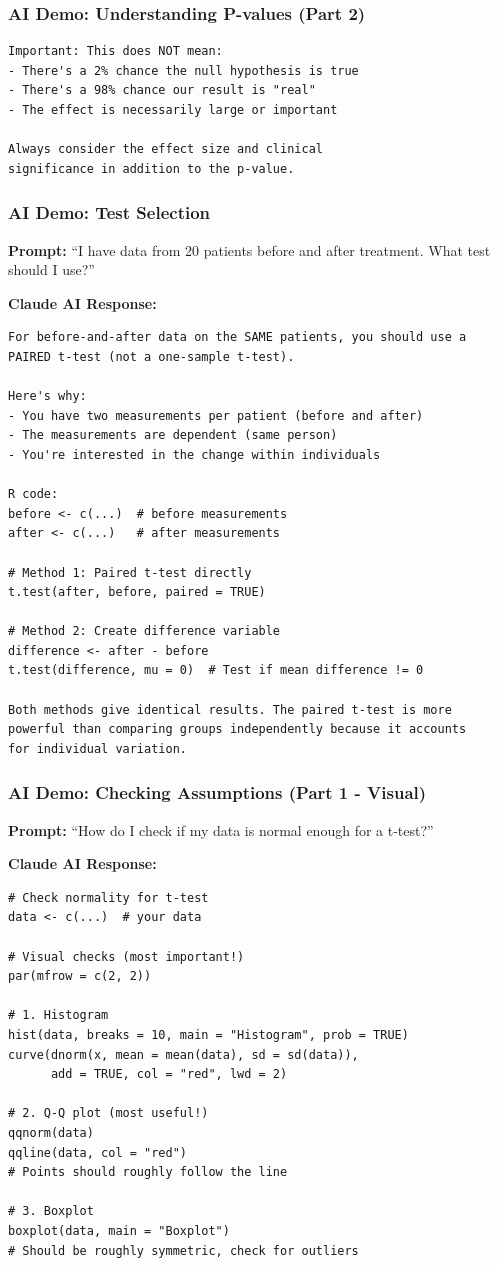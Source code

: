 \documentclass{beamer}
\begin{document}
\begin{frame}[fragile]
\frametitle{AI Demo: Understanding P-values (Part 2)}
\small
\begin{verbatim}
Important: This does NOT mean:
- There's a 2% chance the null hypothesis is true
- There's a 98% chance our result is "real"
- The effect is necessarily large or important

Always consider the effect size and clinical
significance in addition to the p-value.
\end{verbatim}
\end{frame}

\begin{frame}[fragile]
\frametitle{AI Demo: Test Selection}
\textbf{Prompt:} ``I have data from 20 patients before and after treatment. What test should I use?''

\vspace{0.2cm}
\textbf{Claude AI Response:}
\tiny
\begin{verbatim}
For before-and-after data on the SAME patients, you should use a
PAIRED t-test (not a one-sample t-test).

Here's why:
- You have two measurements per patient (before and after)
- The measurements are dependent (same person)
- You're interested in the change within individuals

R code:
before <- c(...)  # before measurements
after <- c(...)   # after measurements

# Method 1: Paired t-test directly
t.test(after, before, paired = TRUE)

# Method 2: Create difference variable
difference <- after - before
t.test(difference, mu = 0)  # Test if mean difference != 0

Both methods give identical results. The paired t-test is more
powerful than comparing groups independently because it accounts
for individual variation.
\end{verbatim}
\end{frame}

\begin{frame}[fragile]
\frametitle{AI Demo: Checking Assumptions (Part 1 - Visual)}
\textbf{Prompt:} ``How do I check if my data is normal enough for a t-test?''

\vspace{0.1cm}
\textbf{Claude AI Response:}
\tiny
\begin{verbatim}
# Check normality for t-test
data <- c(...)  # your data

# Visual checks (most important!)
par(mfrow = c(2, 2))

# 1. Histogram
hist(data, breaks = 10, main = "Histogram", prob = TRUE)
curve(dnorm(x, mean = mean(data), sd = sd(data)),
      add = TRUE, col = "red", lwd = 2)

# 2. Q-Q plot (most useful!)
qqnorm(data)
qqline(data, col = "red")
# Points should roughly follow the line

# 3. Boxplot
boxplot(data, main = "Boxplot")
# Should be roughly symmetric, check for outliers
\end{verbatim}
\end{frame}
\end{document}
